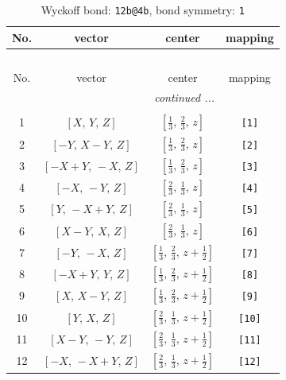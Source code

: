 \documentclass[fleqn,8pt]{jsarticle}
\begin{document}
\begin{longtable}{cccc}
\caption{Wyckoff bond: {\tt 12b@4b}, bond symmetry: {\tt 1}}
 \\
 \hline \hline
No. & vector & center & mapping \\ \hline \endfirsthead

\multicolumn{3}{l}{\tablename\ \thetable{}} \\
 \hline \hline
No. & vector & center & mapping \\ \hline \endhead

 \hline \hline
\multicolumn{3}{r}{\footnotesize\it continued ...} \\ \endfoot

 \hline \hline
\multicolumn{3}{r}{} \\ \endlastfoot

1 & $\left[ X,\, Y,\, Z \right]$ & $\left[ \frac{1}{3},\, \frac{2}{3},\, z \right]$ & {\tt [1]} \\ \hline
2 & $\left[ - Y,\, X - Y,\, Z \right]$ & $\left[ \frac{1}{3},\, \frac{2}{3},\, z \right]$ & {\tt [2]} \\ \hline
3 & $\left[ - X + Y,\, - X,\, Z \right]$ & $\left[ \frac{1}{3},\, \frac{2}{3},\, z \right]$ & {\tt [3]} \\ \hline
4 & $\left[ - X,\, - Y,\, Z \right]$ & $\left[ \frac{2}{3},\, \frac{1}{3},\, z \right]$ & {\tt [4]} \\ \hline
5 & $\left[ Y,\, - X + Y,\, Z \right]$ & $\left[ \frac{2}{3},\, \frac{1}{3},\, z \right]$ & {\tt [5]} \\ \hline
6 & $\left[ X - Y,\, X,\, Z \right]$ & $\left[ \frac{2}{3},\, \frac{1}{3},\, z \right]$ & {\tt [6]} \\ \hline
7 & $\left[ - Y,\, - X,\, Z \right]$ & $\left[ \frac{1}{3},\, \frac{2}{3},\, z + \frac{1}{2} \right]$ & {\tt [7]} \\ \hline
8 & $\left[ - X + Y,\, Y,\, Z \right]$ & $\left[ \frac{1}{3},\, \frac{2}{3},\, z + \frac{1}{2} \right]$ & {\tt [8]} \\ \hline
9 & $\left[ X,\, X - Y,\, Z \right]$ & $\left[ \frac{1}{3},\, \frac{2}{3},\, z + \frac{1}{2} \right]$ & {\tt [9]} \\ \hline
10 & $\left[ Y,\, X,\, Z \right]$ & $\left[ \frac{2}{3},\, \frac{1}{3},\, z + \frac{1}{2} \right]$ & {\tt [10]} \\ \hline
11 & $\left[ X - Y,\, - Y,\, Z \right]$ & $\left[ \frac{2}{3},\, \frac{1}{3},\, z + \frac{1}{2} \right]$ & {\tt [11]} \\ \hline
12 & $\left[ - X,\, - X + Y,\, Z \right]$ & $\left[ \frac{2}{3},\, \frac{1}{3},\, z + \frac{1}{2} \right]$ & {\tt [12]} \\
\end{longtable}
\end{document}
